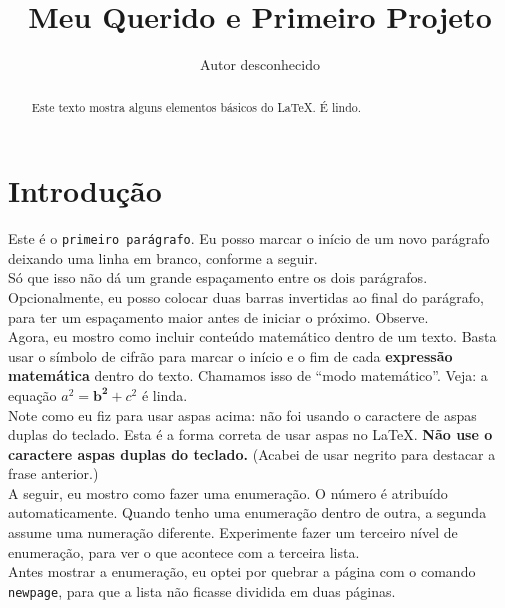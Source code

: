 \documentclass{article}
\title{Meu Querido e Primeiro Projeto}
\author{Autor desconhecido}
\begin{document}
\maketitle

\begin{abstract}
    Este texto mostra alguns elementos básicos do \LaTeX. É lindo.
\end{abstract}

\section{Introdução}

Este é o \texttt{primeiro parágrafo}. Eu posso marcar o início de um novo parágrafo deixando uma linha em branco, conforme a seguir.\\

Só que isso não dá um grande espaçamento entre os dois parágrafos. Opcio\-nalmen\-te, eu posso colocar duas barras invertidas ao final do parágrafo, para ter um espaçamento maior antes de iniciar o próximo. Observe.\\

Agora, eu mostro como incluir conteúdo matemático dentro de um texto. Basta usar o símbolo de cifrão para marcar o início e o fim de cada \textbf{expressão matemática} dentro do texto. Chamamos isso de ``modo matemático''. Veja: a equação $a^2 = \mathbf{b^2} + c^2$ é linda.\\

Note como eu fiz para usar aspas acima: não foi usando o caractere de aspas duplas do teclado. Esta é a forma correta de usar aspas no \LaTeX. \textbf{Não use o caractere aspas duplas do teclado.} (Acabei de usar negrito para destacar a frase anterior.)\\

A seguir, eu mostro como fazer uma enumeração. O número é atribuído automaticamente. Quando tenho uma enumeração dentro de outra, a segunda assume uma numeração diferente. Experimente fazer um terceiro nível de enumeração, para ver o que acontece com a terceira lista.\\

Antes mostrar a enumeração, eu optei por quebrar a página com o comando \texttt{newpage}, para que a lista não ficasse dividida em duas páginas.\\

\newpage
\end{document}
